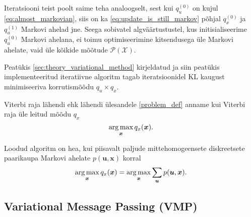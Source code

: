Iteratsiooni teist poolt saime teha analoogselt, sest kui $q_u^{(0)}$ on kujul \eqref{eq:almost_markovian}, siis on ka \eqref{eq:update_is_still_markov} põhjal $q_x^{(0)}$ ja $q_u^{(1)}$ Markovi ahelad jne. 
Seega sobivatel algväärtustustel, kus initisialiseerime $q_u^{(0)}$ Markovi ahelana, ei toimu optimiseerimine kitsendusega üle Markovi ahelate, vaid üle kõikide mõõtude $\mathcal{P}(\mathcal{X})$.  

Peatükis \ref{sec:theory_variational_method} kirjeldatud ja siin peatükis implementeeritud iteratiivne algoritm tagab iteratsioonidel KL kaugust minimiseeriva korrutismõõdu $q_u \times q_x$. 

Viterbi raja lähendi ehk lähendi ülesandele \eqref{problem_def} anname kui Viterbi raja üle leitud mõõdu $q_x$
$$\operatorname*{arg\,max}_{\bm{x}} q_x(\bm{x}).$$


Loodud algoritm on hea, kui piisavalt paljude  mittehomogeensete diskreetsete paarikaupa Markovi ahelate $p(\bm{u},\bm{x})$ korral
$$ \operatorname*{arg\,max}_{\bm{x}} q_x(\bm{x}) = \operatorname*{arg\,max}_{\bm{x}} \sum_{\bm{u}} p(\bm{u},\bm{x}). $$

\subsection{Variational Message Passing (VMP)}\label{sec:VMP}


